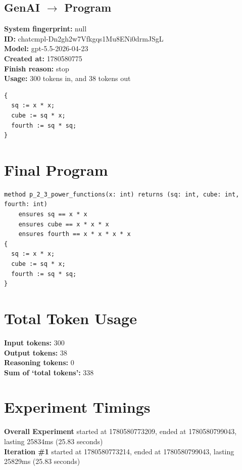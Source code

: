 \documentclass{article}
\begin{document}
\subsection*{GenAI $\rightarrow$ Program}
\textbf{System fingerprint: }null
\\\textbf{ID: }chatcmpl-Dn2gh2w7Vfkgqs1Mu8ENi0drmJSgL
\\\textbf{Model: }gpt-5.5-2026-04-23
\\\textbf{Created at: }1780580775
\\\textbf{Finish reason: }stop
\\\textbf{Usage: }300 tokens in, and 38 tokens out
\begin{lstlisting}
{
  sq := x * x;
  cube := sq * x;
  fourth := sq * sq;
}
\end{lstlisting}
\section*{Final Program}
\begin{lstlisting}
method p_2_3_power_functions(x: int) returns (sq: int, cube: int, fourth: int)
	ensures sq == x * x
	ensures cube == x * x * x
	ensures fourth == x * x * x * x
{
  sq := x * x;
  cube := sq * x;
  fourth := sq * sq;
}
\end{lstlisting}
\section*{Total Token Usage}
\textbf{Input tokens: }300
\\\textbf{Output tokens: }38
\\\textbf{Reasoning tokens: }0
\\\textbf{Sum of `total tokens': }338
\section*{Experiment Timings}
\textbf{Overall Experiment} started at 1780580773209, ended at 1780580799043, lasting 25834ms (25.83 seconds)
\\\textbf{Iteration \#1} started at 1780580773214, ended at 1780580799043, lasting 25829ms (25.83 seconds)
\end{document}
